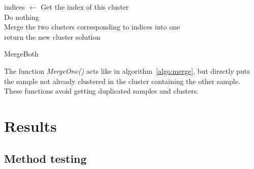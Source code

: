 \documentclass[twocolumn,12pt]{article}
\begin{document}
\begin{algorithm}[!]
 \BlankLine
 {
  {
   indices $\leftarrow$ Get the index of this cluster\\
  }
  \Else
  {
   Do nothing\\
  }
 }
 Merge the two clusters corresponding to indices into one\\
 return the new cluster solution
 \caption{MergeBoth}
 \label{algo:merge}
\end{algorithm}
The function \emph{MergeOne()} acts like in algorithm~\ref{algo:merge}, but directly puts the sample not already clustered in the cluster containing the other sample.
These functions avoid getting duplicated samples and clusters.

\section{Results}

\subsection{Method testing}
\end{document}
